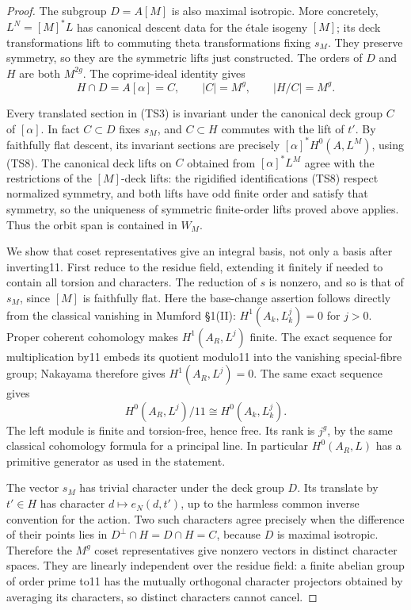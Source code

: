 \documentclass[11pt,a4paper]{article}
\theoremstyle{definition}\newtheorem{remark}[theorem]{Remark}
\begin{document}
\begin{proof}
The subgroup \(D=A[M]\) is also maximal isotropic. More concretely, \(L^N=[M]^*L\) has canonical descent data for the étale isogeny \([M]\); its deck transformations lift to commuting theta transformations fixing \(s_M\). They preserve symmetry, so they are the symmetric lifts just constructed. The orders of \(D\) and \(H\) are both \(M^{2g}\). The coprime-ideal identity gives \[
 H\cap D=A[\alpha]=C,\qquad |C|=M^g,
 \qquad |H/C|=M^g.
 \tag{TS10}
\]

Every translated section in (TS3) is invariant under the canonical deck group \(C\) of \([\alpha]\). In fact \(C\subset D\) fixes \(s_M\), and \(C\subset H\) commutes with the lift of \(t'\). By faithfully flat descent, its invariant sections are precisely \([\alpha]^*H^0(A,L^M)\), using (TS8). The canonical deck lifts on \(C\) obtained from \([\alpha]^*L^M\) agree with the restrictions of the \([M]\)-deck lifts: the rigidified identifications (TS8) respect normalized symmetry, and both lifts have odd finite order and satisfy that symmetry, so the uniqueness of symmetric finite-order lifts proved above applies. Thus the orbit span is contained in \(W_M\).

We show that coset representatives give an integral basis, not only a basis after inverting11. First reduce to the residue field, extending it finitely if needed to contain all torsion and characters. The reduction of \(s\) is nonzero, and so is that of \(s_M\), since \([M]\) is faithfully flat. Here the base-change assertion follows directly from the classical vanishing in Mumford §1(II): \(H^1(A_k,L_k^j)=0\) for \(j>0\). Proper coherent cohomology makes \(H^1(A_R,L^j)\) finite. The exact sequence for multiplication by11 embeds its quotient modulo11 into the vanishing special-fibre group; Nakayama therefore gives \(H^1(A_R,L^j)=0\). The same exact sequence gives \[
 H^0(A_R,L^j)/11\cong H^0(A_k,L_k^j).
 \tag{TS11}
\] The left module is finite and torsion-free, hence free. Its rank is \(j^g\), by the same classical cohomology formula for a principal line. In particular \(H^0(A_R,L)\) has a primitive generator as used in the statement.

The vector \(s_M\) has trivial character under the deck group \(D\). Its translate by \(t'\in H\) has character \(d\mapsto e_N(d,t')\), up to the harmless common inverse convention for the action. Two such characters agree precisely when the difference of their points lies in \(D^\perp\cap H=D\cap H=C\), because \(D\) is maximal isotropic. Therefore the \(M^g\) coset representatives give nonzero vectors in distinct character spaces. They are linearly independent over the residue field: a finite abelian group of order prime to11 has the mutually orthogonal character projectors obtained by averaging its characters, so distinct characters cannot cancel.


\end{proof}
\end{document}
